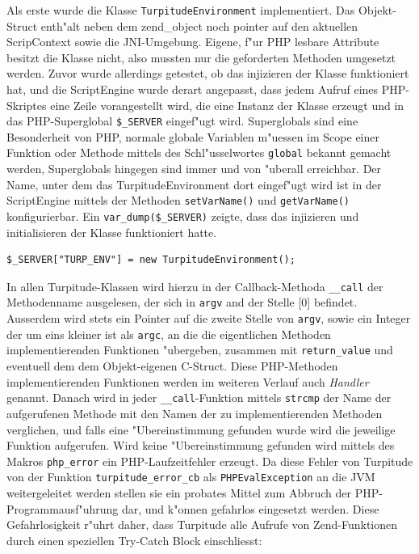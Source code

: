 Als erste wurde die Klasse \texttt{TurpitudeEnvironment} implementiert. Das Objekt-Struct enth"alt neben dem zend\_object noch pointer
auf den aktuellen ScripContext sowie die JNI-Umgebung. Eigene, f"ur PHP lesbare Attribute besitzt die Klasse nicht, also mussten
nur die geforderten Methoden umgesetzt werden. Zuvor wurde allerdings getestet, ob das injizieren der Klasse funktioniert hat, und die
ScriptEngine wurde derart angepasst, dass jedem Aufruf eines PHP-Skriptes eine Zeile vorangestellt wird, die eine Instanz der Klasse
erzeugt und in das PHP-Superglobal \texttt{\$\_SERVER} eingef"ugt wird. Superglobals sind eine Besonderheit von PHP, normale globale
Variablen m"uessen im Scope einer Funktion oder Methode mittels des Schl"usselwortes \texttt{global} bekannt gemacht werden, Superglobals
hingegen sind immer und von "uberall erreichbar. Der Name, unter dem das TurpitudeEnvironment dort eingef"ugt wird ist in der ScriptEngine
mittels der Methoden \texttt{setVarName()} und \texttt{getVarName()} konfigurierbar. Ein \texttt{var\_dump(\$\_SERVER)} zeigte, dass das
injizieren und initialisieren der Klasse funktioniert hatte.
\begin{lstlisting}[caption=TurpitudeEnvironment in \$\_SERVER einf"ugen]
$_SERVER["TURP_ENV"] = new TurpitudeEnvironment();
\end{lstlisting}
In allen Turpitude-Klassen wird hierzu in der Callback-Methoda \texttt{\_\_call} der 
Methodenname ausgelesen, der sich in \texttt{argv} and der Stelle [0] befindet. Ausserdem wird stets ein Pointer auf die zweite Stelle
von \texttt{argv}, sowie ein Integer der um eins kleiner ist als \texttt{argc}, an die die eigentlichen
Methoden implementierenden Funktionen "ubergeben, zusammen mit \texttt{return\_value} und eventuell dem dem Objekt-eigenen C-Struct.
Diese PHP-Methoden implementierenden Funktionen werden im weiteren Verlauf auch \emph{Handler} genannt.
Danach wird in jeder \texttt{\_\_call}-Funktion mittels \texttt{strcmp} der Name der aufgerufenen Methode mit den Namen der zu implementierenden 
Methoden verglichen, und falls eine "Ubereinstimmung gefunden wurde wird die jeweilige Funktion aufgerufen. Wird keine "Ubereinstimmung
gefunden wird mittels des Makros \texttt{php\_error} ein PHP-Laufzeitfehler erzeugt. Da diese Fehler von Turpitude von der Funktion
\texttt{turpitude\_error\_cb} als \texttt{PHPEvalException} an die JVM weitergeleitet werden stellen sie ein probates Mittel zum Abbruch
der PHP-Programmausf"uhrung dar, und k"onnen gefahrlos eingesetzt werden. 
Diese Gefahrlosigkeit r"uhrt daher, dass Turpitude alle Aufrufe von Zend-Funktionen durch einen speziellen Try-Catch Block einschliesst:
